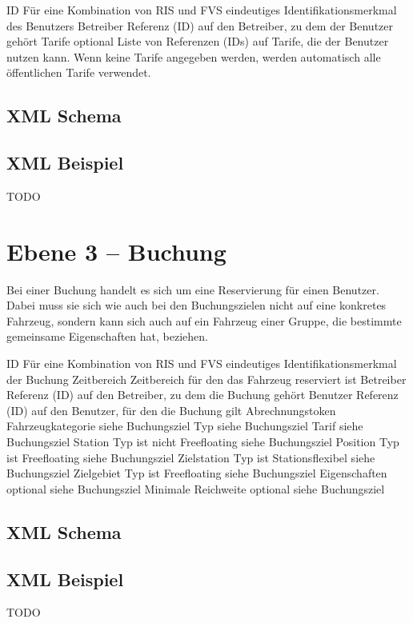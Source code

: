 ID		Für eine Kombination von RIS und FVS eindeutiges Identifikationsmerkmal des Benutzers
Betreiber		Referenz (ID) auf den Betreiber, zu dem der Benutzer gehört
Tarife	optional	Liste von Referenzen (IDs) auf Tarife, die der Benutzer nutzen kann. Wenn keine Tarife angegeben werden, werden automatisch alle öffentlichen Tarife verwendet.

\subsection{XML Schema}


\subsection{XML Beispiel}
TODO

\section{Ebene 3 -- Buchung}
Bei einer Buchung handelt es sich um eine Reservierung für einen Benutzer. Dabei muss sie sich wie auch bei den Buchungszielen nicht auf eine konkretes Fahrzeug, sondern kann sich auch auf ein Fahrzeug einer Gruppe, die bestimmte gemeinsame Eigenschaften hat, beziehen.

ID		Für eine Kombination von RIS und FVS eindeutiges Identifikationsmerkmal der Buchung
Zeitbereich		Zeitbereich für den das Fahrzeug reserviert ist
Betreiber		Referenz (ID) auf den Betreiber, zu dem die Buchung gehört
Benutzer		Referenz (ID) auf den Benutzer, für den die Buchung gilt
Abrechnungstoken		
Fahrzeugkategorie		siehe Buchungsziel
Typ		siehe Buchungsziel
Tarif		siehe Buchungsziel
Station	Typ ist nicht Freefloating	siehe Buchungsziel
Position	Typ ist Freefloating	siehe Buchungsziel
Zielstation 	Typ ist Stationsflexibel	siehe Buchungsziel
Zielgebiet	Typ ist Freefloating	siehe Buchungsziel
Eigenschaften	optional	siehe Buchungsziel
Minimale Reichweite	optional	siehe Buchungsziel

\subsection{XML Schema}


\subsection{XML Beispiel}
TODO